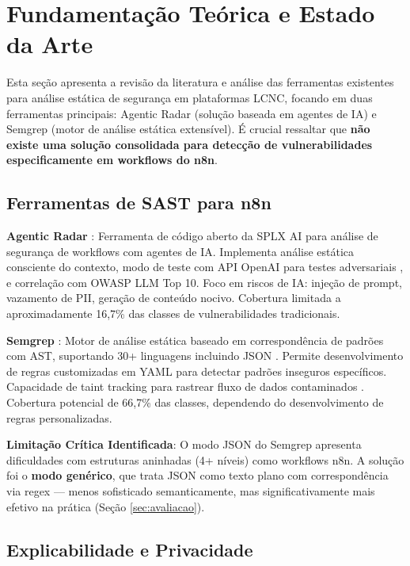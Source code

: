 \documentclass[12pt,a4paper]{article}
\begin{document}
\section{Fundamentação Teórica e Estado da Arte}
\label{sec:fundamentacao}

Esta seção apresenta a revisão da literatura e análise das ferramentas existentes para análise estática de segurança em plataformas LCNC, focando em duas ferramentas principais: Agentic Radar (solução baseada em agentes de IA) e Semgrep (motor de análise estática extensível). É crucial ressaltar que \textbf{não existe uma solução consolidada para detecção de vulnerabilidades especificamente em workflows do n8n}.

\subsection{Ferramentas de SAST para n8n}

\textbf{Agentic Radar} \cite{splxai_n8n_scanning}: Ferramenta de código aberto da SPLX AI para análise de segurança de workflows com agentes de IA. Implementa análise estática consciente do contexto, modo de teste com API OpenAI para testes adversariais \cite{splxai_medium_scanning}, e correlação com OWASP LLM Top 10. Foco em riscos de IA: injeção de prompt, vazamento de PII, geração de conteúdo nocivo. Cobertura limitada a aproximadamente 16,7\% das classes de vulnerabilidades tradicionais.

\textbf{Semgrep} \cite{semgrep_platform}: Motor de análise estática baseado em correspondência de padrões com AST, suportando 30+ linguagens incluindo JSON \cite{semgrep_custom_rules}. Permite desenvolvimento de regras customizadas em YAML para detectar padrões inseguros específicos. Capacidade de taint tracking para rastrear fluxo de dados contaminados \cite{prototype_pollution}. Cobertura potencial de 66,7\% das classes, dependendo do desenvolvimento de regras personalizadas.

\textbf{Limitação Crítica Identificada}: O modo JSON do Semgrep apresenta dificuldades com estruturas aninhadas (4+ níveis) como workflows n8n. A solução foi o \textbf{modo genérico}, que trata JSON como texto plano com correspondência via regex — menos sofisticado semanticamente, mas significativamente mais efetivo na prática (Seção \ref{sec:avaliacao}).

\subsection{Explicabilidade e Privacidade}
\end{document}
